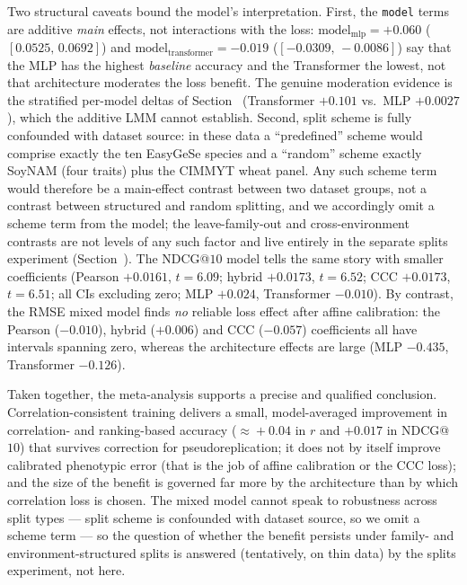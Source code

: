 Two structural caveats bound the model's interpretation. First, the
\texttt{model} terms are additive \emph{main} effects, not interactions with the
loss: $\mathrm{model}_{\mathrm{mlp}}=+0.060$ ($[0.0525,\,0.0692]$) and
$\mathrm{model}_{\mathrm{transformer}}=-0.019$ ($[-0.0309,\,-0.0086]$) say that the
MLP has the highest \emph{baseline} accuracy and the Transformer the lowest, not
that architecture moderates the loss benefit. The genuine moderation evidence is
the stratified per-model deltas of Section~ (Transformer
$+0.101$ vs.\ MLP $+0.0027$), which the additive LMM cannot establish. Second,
split scheme is fully confounded with dataset source: in these data a
``predefined'' scheme would comprise exactly the ten EasyGeSe species and a
``random'' scheme exactly SoyNAM (four traits) plus the CIMMYT wheat panel. Any
such scheme term would therefore be a main-effect contrast between two dataset
groups, not a contrast between structured and random splitting, and we accordingly
omit a scheme term from the model; the leave-family-out and cross-environment
contrasts are not levels of any such factor and live entirely in the separate
splits experiment (Section~). The NDCG@$10$ model tells the same
story with smaller coefficients (Pearson $+0.0161$, $t=6.09$; hybrid $+0.0173$,
$t=6.52$; CCC $+0.0173$, $t=6.51$; all CIs excluding zero; MLP $+0.024$,
Transformer $-0.010$). By
contrast, the RMSE mixed model finds \emph{no} reliable loss effect after affine
calibration: the Pearson ($-0.010$), hybrid ($+0.006$) and CCC ($-0.057$)
coefficients all have intervals spanning zero, whereas the architecture effects
are large (MLP $-0.435$, Transformer $-0.126$).

Taken together, the meta-analysis supports a precise and qualified conclusion.
Correlation-consistent training delivers a small, model-averaged improvement in
correlation- and ranking-based accuracy ($\approx\!+0.04$ in $r$ and $+0.017$ in
NDCG@$10$) that survives correction for pseudoreplication; it does not by itself
improve calibrated phenotypic error (that is the job of affine calibration or the
CCC loss); and the size of the benefit is governed far more by the architecture
than by which correlation loss is chosen. The mixed model cannot speak to
robustness across split types --- split scheme is confounded with dataset source,
so we omit a scheme term --- so the question of whether the benefit persists under
family- and environment-structured splits is answered (tentatively, on thin data)
by the splits experiment, not here.
